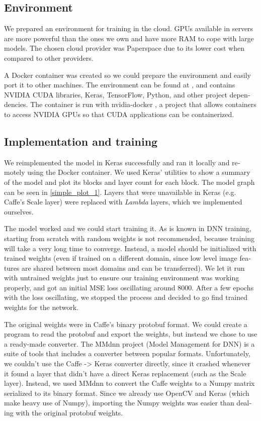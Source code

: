 \documentclass[12pt,openright,twoside,a4paper,english]{abntex2}
\begin{document}
\begin{otherlanguage}{english}
\subsection{Environment}

We prepared an environment for training in the cloud. GPUs available in servers are more powerful than the ones we own and have more RAM to cope with large models. The chosen cloud provider was Paperspace %
due to its lower cost when compared to other providers.

A Docker container was created so we could prepare the environment and easily port it to other machines. The environment can be found at \cite{colormotion_docker},
and contains NVIDIA CUDA libraries, Keras, TensorFlow, Python, and other project dependencies. The container is run with nvidia-docker \cite{nvidia_docker},
a project that allows containers to access NVIDIA GPUs so that CUDA applications can be containerized.

\subsection{Implementation and training}

We reimplemented the model in Keras successfully and ran it locally and remotely using the Docker container. We used Keras' utilities to show a summary of the model and plot its blocks and layer count for each block. The model graph can be seen in \ref{simple_plot_1}. Layers that were unavailable in Keras (e.g. Caffe's Scale layer) were replaced with \textit{Lambda} layers, which we implemented ourselves.

The model worked and we could start training it. As is known in DNN training, starting from scratch with random weights is not recommended, because training will take a very long time to converge. Instead, a model should be initialized with trained weights (even if trained on a different domain, since low level image features are shared between most domains and can be transferred). We let it run with untrained weights just to ensure our training environment was working properly, and got an initial MSE loss oscillating around 8000. After a few epochs with the loss oscillating, we stopped the process and decided to go find trained weights for the network.

The original weights were in Caffe's binary protobuf format. We could create a program to read the protobuf and export the weights, but instead we chose to use a ready-made converter. The MMdnn %
project (Model Management for DNN) is a suite of tools that includes a converter between popular formats. Unfortunately, we couldn't use the Caffe -> Keras converter directly, since it crashed whenever it found a layer that didn't have a direct Keras replacement (such as the Scale layer). Instead, we used MMdnn to convert the Caffe weights to a Numpy matrix serialized to its binary format. Since we already use OpenCV and Keras (which make heavy use of Numpy), importing the Numpy weights was easier than dealing with the original protobuf weights.


\end{otherlanguage}
\end{document}
